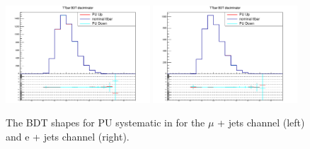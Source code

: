 \begin{figure}[ht!]
    \includegraphics[width=0.48\textwidth]{images/Run2/Sys/PUsystt.pdf} 
    \includegraphics[width=0.48\textwidth]{images/Run2/Sys/PUsystt_e.pdf}     
    \caption{The BDT shapes for PU systematic in \ttbar for the $\mu$ + jets channel (left) and e + jets channel (right).}
    \label{fig:SysShapesPUtt}
\end{figure}



